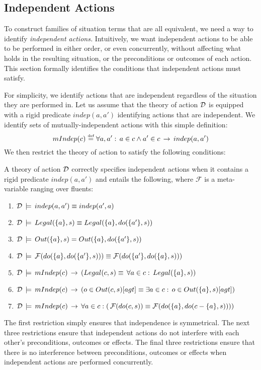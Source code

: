 \subsection{Independent Actions}

To construct families of situation terms that are all equivalent,
we need a way to identify \emph{independent actions.} Intuitively,
we want independent actions to be able to be performed in either order,
or even concurrently, without affecting what holds in the resulting
situation, or the preconditions or outcomes of each action. This section
formally identifies the conditions that independent actions must satisfy.

For simplicity, we identify actions that are independent regardless
of the situation they are performed in. Let us assume that the theory
of action $\mathcal{D}$ is equipped with a rigid predicate $indep(a,a')$
identifying actions that are independent. We identify sets of mutually-independent
actions with this simple definition:\[
mIndep(c)\stackrel{\mbox{\tiny def}}{=}\forall a,a':\, a\in c\wedge a'\in c\,\rightarrow\, indep(a,a')\]
 We then restrict the theory of action to satisfy the following conditions:

\begin{defnL}
 A theory of action $\mathcal{D}$ correctly
specifies independent actions when it contains a rigid predicate $indep(a,a')$
and entails the following, where $\mathcal{F}$ is a meta-variable
ranging over fluents:\label{def:Independent-Actions} 
\end{defnL}
\begin{enumerate}
\item $\mathcal{D}\,\models\, indep(a,a')\equiv indep(a',a)$ 
\item $\mathcal{D}\,\models\, Legal(\{a\},s)\equiv Legal(\{a\},do(\{a'\},s))$ 
\item $\mathcal{D}\,\models\, Out(\{a\},s)=Out(\{a\},do(\{a'\},s))$ 
\item $\mathcal{D}\,\models\,\mathcal{F}(do(\{a\},do(\{a'\},s)))\equiv\mathcal{F}(do(\{a'\},do(\{a\},s)))$ 
\item $\mathcal{D}\,\models\, mIndep(c)\,\rightarrow\,\left(Legal(c,s)\equiv\,\forall a\in c:\, Legal(\{a\},s)\right)$ 
\item $\mathcal{D}\,\models\, mIndep(c)\,\rightarrow\,\left(o\in Out(c,s)[agt]\equiv\exists a\in c:\, o\in Out(\{a\},s)[agt]\right)$ 
\item $\mathcal{D}\,\models\, mIndep(c)\,\rightarrow\,\forall a\in c:\left(\,\mathcal{F}(do(c,s))\equiv\mathcal{F}(do(\{a\},do(c-\{a\},s)))\right)$ 
\end{enumerate}
The first restriction simply ensures that independence is symmetrical.
The next three restrictions ensure that independent actions do not
interfere with each other's preconditions, outcomes or effects. The
final three restrictions ensure that there is no interference between
preconditions, outcomes or effects when independent actions are performed
concurrently.

